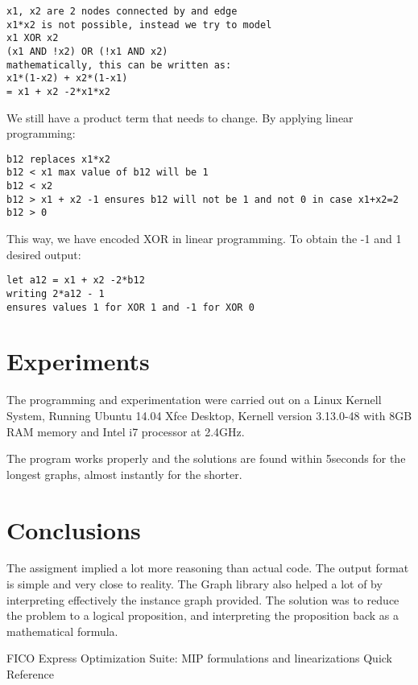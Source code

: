 \documentclass[11pt]{article}   %
\begin{document}
\begin{lstlisting}
x1, x2 are 2 nodes connected by and edge
x1*x2 is not possible, instead we try to model
x1 XOR x2
(x1 AND !x2) OR (!x1 AND x2)
mathematically, this can be written as:
x1*(1-x2) + x2*(1-x1)
= x1 + x2 -2*x1*x2
\end{lstlisting} 

We still have a product term that needs to change.
By applying linear programming:

\begin{lstlisting}
b12 replaces x1*x2
b12 < x1 max value of b12 will be 1
b12 < x2
b12 > x1 + x2 -1 ensures b12 will not be 1 and not 0 in case x1+x2=2
b12 > 0
\end{lstlisting}

This way, we have encoded XOR in linear programming.
To obtain the -1 and 1 desired output:

\begin{lstlisting}
let a12 = x1 + x2 -2*b12
writing 2*a12 - 1
ensures values 1 for XOR 1 and -1 for XOR 0
\end{lstlisting}
\section{Experiments}   

The programming and experimentation were carried out on a Linux Kernell System, Running Ubuntu 14.04 Xfce Desktop, Kernell version 3.13.0-48 with 8GB RAM memory and Intel i7 processor at 2.4GHz.

The program works properly and the solutions are found within 5seconds for the longest graphs, almost instantly for the shorter.
\section{Conclusions}         

The assigment implied a lot more reasoning than actual code. The output format is simple and very close to reality.
The Graph library also helped a lot of by interpreting effectively the instance graph provided.
The solution was to reduce the problem to a logical proposition, and interpreting the proposition back as a mathematical formula.



\begin{thebibliography}{1}
FICO Express Optimization Suite: MIP formulations and linearizations Quick Reference
\end{thebibliography}
\end{document}
